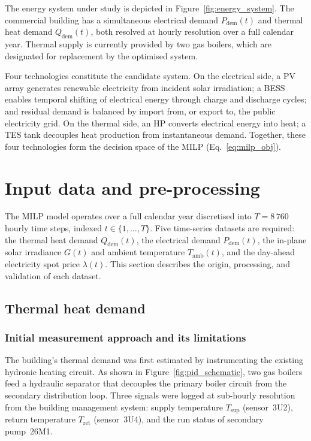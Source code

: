 \documentclass[11pt,a4paper]{report}
\begin{document}
The energy system under study is depicted in Figure~\ref{fig:energy_system}.
The commercial building has a simultaneous electrical demand $P_\mathrm{dem}(t)$
and thermal heat demand $Q_\mathrm{dem}(t)$, both resolved at hourly resolution
over a full calendar year.
Thermal supply is currently provided by two gas boilers, which are designated
for replacement by the optimised system.

Four technologies constitute the candidate system.
On the electrical side, a PV array generates renewable electricity from incident
solar irradiation; a BESS enables temporal shifting of electrical energy through
charge and discharge cycles; and residual demand is balanced by import from, or
export to, the public electricity grid.
On the thermal side, an HP converts electrical energy into heat; a TES tank
decouples heat production from instantaneous demand.
Together, these four technologies form the decision space of the MILP
(Eq.~\eqref{eq:milp_obj}).

\section{Input data and pre-processing}
\label{sec:data_inputs}

The MILP model operates over a full calendar year discretised into $T = 8\,760$ hourly time steps, indexed $t \in \{1, \ldots, T\}$.
Five time-series datasets are required: the thermal heat demand $Q_\mathrm{dem}(t)$, the electrical demand $P_\mathrm{dem}(t)$, the in-plane solar irradiance $G(t)$ and ambient temperature $T_\mathrm{amb}(t)$, and the day-ahead electricity spot price $\lambda(t)$.
This section describes the origin, processing, and validation of each dataset.

\subsection{Thermal heat demand}
\label{subsec:thermal_demand}

\subsubsection*{Initial measurement approach and its limitations}

The building's thermal demand was first estimated by instrumenting the existing hydronic
heating circuit.
As shown in Figure~\ref{fig:pid_schematic}, two gas boilers feed a hydraulic separator
that decouples the primary boiler circuit from the secondary distribution loop.
Three signals were logged at sub-hourly resolution from the building management system:
supply temperature $T_\mathrm{sup}$ (sensor~3U2), return temperature $T_\mathrm{ret}$
(sensor~3U4), and the run status of secondary pump~26M1.
\end{document}
